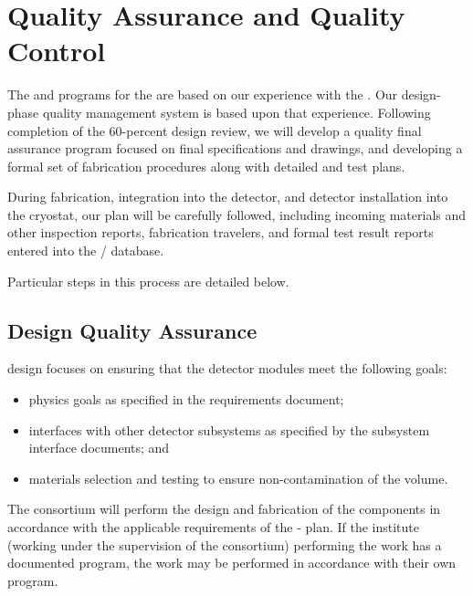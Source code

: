 \section{Quality Assurance and Quality Control}
\label{sec:fdsp-pd-qaqc}

The  and  programs for the  are based on our experience with the .  Our design-phase quality management system is based upon that experience.  Following completion of the 60-percent design review, we will develop a quality final assurance program focused on final specifications and drawings, and developing a formal set of fabrication procedures along with detailed  and test plans.

During fabrication, integration into the detector, and detector installation into the cryostat, our  plan will be carefully followed, including incoming materials and other inspection reports, fabrication travelers, and formal test result reports entered into the  / database.

Particular steps in this process are detailed below.

\subsection{Design Quality Assurance}
\label{sec:fdsp-pd-designqa}

 design  focuses on ensuring that the detector modules meet the following goals:
\begin{itemize}
\item physics goals as specified in the  requirements document;
\item interfaces with other detector subsystems as specified by the subsystem interface documents; and
\item materials selection and testing to ensure non-contamination of the  volume.
\end{itemize}

The  consortium will perform the design and fabrication of the components in accordance with the applicable requirements of the -  plan. If the institute (working under the supervision of the consortium) performing the work has a documented  program, the work may be performed in accordance with their own program.

